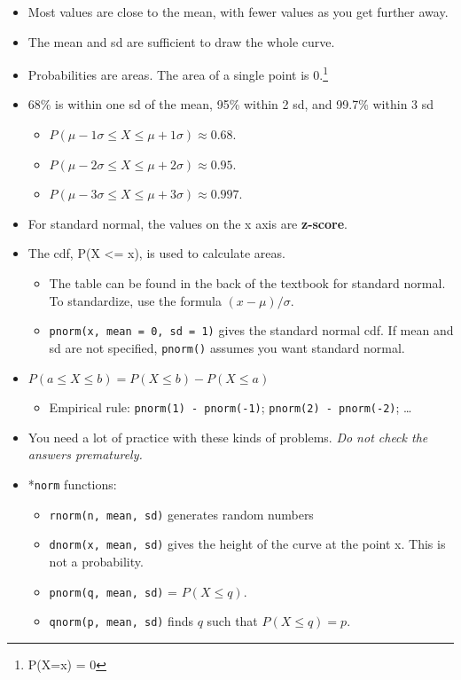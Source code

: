 \documentclass[
  letterpaper,
  DIV=11,
  numbers=noendperiod,
  oneside]{scrreprt}
\providecommand{\tightlist}{%
  \setlength{\itemsep}{0pt}\setlength{\parskip}{0pt}}\usepackage{longtable,booktabs,array}
\begin{document}
\begin{itemize}
\tightlist
\item
  Most values are close to the mean, with fewer values as you get
  further away.
\item
  The mean and sd are sufficient to draw the whole curve.
\item
  Probabilities are areas. The area of a single point is 0.\footnote{P(X=x)
    = 0}
\item
  68\% is within one sd of the mean, 95\% within 2 sd, and 99.7\% within
  3 sd

  \begin{itemize}
  \tightlist
  \item
    \(P(\mu - 1\sigma \le X \le \mu + 1\sigma) \approx 0.68\).
  \item
    \(P(\mu - 2\sigma \le X \le \mu + 2\sigma) \approx 0.95\).
  \item
    \(P(\mu - 3\sigma \le X \le \mu + 3\sigma) \approx 0.997\).
  \end{itemize}
\item
  For standard normal, the values on the x axis are \textbf{z-score}.
\item
  The cdf, P(X \textless= x), is used to calculate areas.

  \begin{itemize}
  \tightlist
  \item
    The table can be found in the back of the textbook for standard
    normal. To standardize, use the formula \((x-\mu)/\sigma\).
  \item
    \texttt{pnorm(x,\ mean\ =\ 0,\ sd\ =\ 1)} gives the standard normal
    cdf. If mean and sd are not specified, \texttt{pnorm()} assumes you
    want standard normal.
  \end{itemize}
\item
  \(P(a \le X \le b) = P(X \le b) - P(X \le a)\)

  \begin{itemize}
  \tightlist
  \item
    Empirical rule: \texttt{pnorm(1)\ -\ pnorm(-1)};
    \texttt{pnorm(2)\ -\ pnorm(-2)}; \ldots{}
  \end{itemize}
\item
  You need a lot of practice with these kinds of problems. \emph{Do not
  check the answers prematurely.}
\item
  *\texttt{norm} functions:

  \begin{itemize}
  \tightlist
  \item
    \texttt{rnorm(n,\ mean,\ sd)} generates random numbers
  \item
    \texttt{dnorm(x,\ mean,\ sd)} gives the height of the curve at the
    point x. This is not a probability.
  \item
    \texttt{pnorm(q,\ mean,\ sd)} = \(P(X \le q)\).
  \item
    \texttt{qnorm(p,\ mean,\ sd)} finds \(q\) such that
    \(P(X \le q) = p\).


\end{itemize}
\end{itemize}
\end{document}
